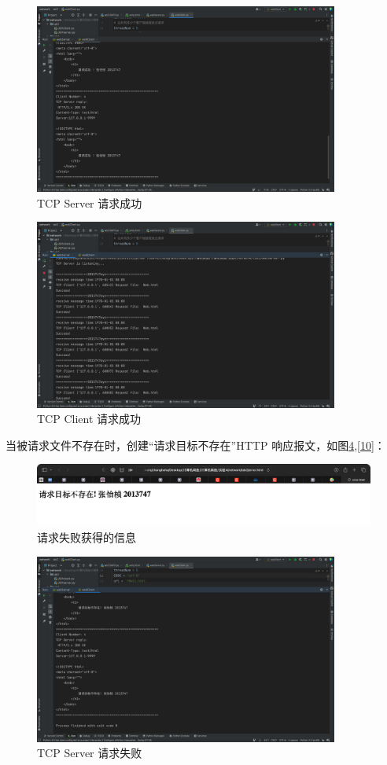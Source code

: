 \documentclass[a4paper,12pt]{report}
\begin{document}
\begin{spacing}{1.5}
\begin{figure}[H]
  \centering
\includegraphics[width=10cm]{figure/tcp_c_s.png}
\caption{TCP Server 请求成功}
\label{7}
\end{figure}

\begin{figure}[H]
  \centering
\includegraphics[width=10cm]{figure/tcp_s_s.png}
\caption{TCP Client 请求成功}
\label{8}
\end{figure}

当被请求文件不存在时，创建“请求目标不存在”HTTP 响应报文，如图\ref{9},\ref{10}：
\begin{figure}[H]
  \centering
\includegraphics[width=12cm]{figure/error.png}
\caption{请求失败获得的信息}
\label{error}
\end{figure}

\begin{figure}[H]
  \centering
\includegraphics[width=10cm]{figure/tcp_c_w.png}
\caption{TCP Server 请求失败}
\label{9}
\end{figure}


\end{spacing}
\end{document}
